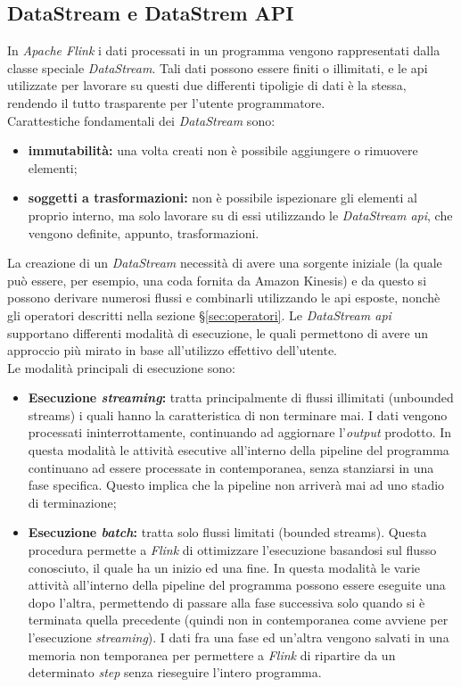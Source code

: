\subsection{DataStream e DataStrem API}
In \textit{Apache Flink} i dati processati in un programma vengono rappresentati dalla classe speciale \textit{DataStream}.
Tali dati possono essere finiti o illimitati, e le \gls{api} utilizzate per lavorare su questi due differenti tipoligie di dati è la stessa, rendendo il tutto trasparente per l'utente programmatore.\\
Carattestiche fondamentali dei \textit{DataStream} sono:
\begin{itemize}
	\item{\textbf{immutabilità:} una volta creati non è possibile aggiungere o rimuovere elementi;}
	\item{\textbf{soggetti a trasformazioni:} non è possibile ispezionare gli elementi al proprio interno, ma solo lavorare su di essi utilizzando le \textit{DataStream \gls{api}}, che vengono definite, appunto, trasformazioni.}
\end{itemize}
La creazione di un \textit{DataStream} necessità di avere una sorgente iniziale (la quale può essere, per esempio, una coda fornita da \gls{Amazon Kinesis}) e da questo si possono derivare numerosi flussi e combinarli utilizzando le \gls{api} esposte, nonchè gli operatori descritti nella sezione \S\ref{sec:operatori}.
Le \textit{DataStream \gls{api}} supportano differenti modalità di esecuzione, le quali permettono di avere un approccio più mirato in base all'utilizzo effettivo dell'utente.\\
Le modalità principali di esecuzione sono:
\begin{itemize}
	\item{\textbf{Esecuzione \textit{streaming}:} tratta principalmente di flussi illimitati (\gls{unbounded streams}) i quali hanno la caratteristica di non terminare mai. I dati vengono processati ininterrottamente, continuando ad aggiornare l'\textit{output} prodotto. In questa modalità le attività esecutive all'interno della \gls{pipeline} del programma continuano ad essere processate in contemporanea, senza stanziarsi in una fase specifica. Questo implica che la \gls{pipeline} non arriverà mai ad uno stadio di terminazione;}
	\item{\textbf{Esecuzione \textit{batch}:} tratta solo flussi limitati (\gls{bounded streams}). Questa procedura permette a \textit{Flink} di ottimizzare l'esecuzione basandosi sul flusso conosciuto, il quale ha un inizio ed una fine. In questa modalità le varie attività all'interno della \gls{pipeline} del programma possono essere eseguite una dopo l'altra, permettendo di passare alla fase successiva solo quando si è terminata quella precedente (quindi non in contemporanea come avviene per l'esecuzione \textit{streaming}). I dati fra una fase ed un'altra vengono salvati in una memoria non temporanea per permettere a \textit{Flink} di ripartire da un determinato \textit{step} senza rieseguire l'intero programma.}
\end{itemize}

